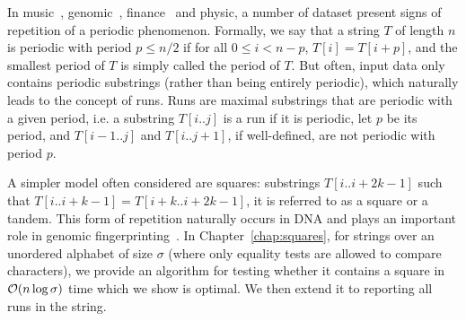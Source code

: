 In music~\cite{arom1989time}, genomic~\cite{pich2018somatic}, finance~\cite{harvey2007trends} and physic, a number of dataset present signs of repetition of a periodic phenomenon.
Formally, we say that a string $T$ of length $n$ is periodic with period $p \leq n/2$ if for all $0 \leq i < n - p$, $T[i]=T[i+p]$, and the smallest period of $T$ is simply called the period of $T$.
%
But often, input data only contains periodic substrings (rather than being entirely periodic), which naturally leads to the concept of runs. Runs are maximal substrings that are periodic with a given period, i.e. a substring $T[i..j]$ is a run if it is periodic, let $p$ be its period, and $T[i-1..j]$ and $T[i..j+1]$, if well-defined, are not periodic with period $p$. 

A simpler model often considered are squares: substrings $T[i..i+2k-1]$ such that $T[i..i+k-1]=T[i+k..i+2k-1]$, it is referred to as a square or a tandem. This form of repetition naturally occurs in DNA and plays an important role in genomic fingerprinting~\cite{Kolpakov2003,GYMREK20179}. 
%
In Chapter~\ref{chap:squares}, for strings over an unordered alphabet of size $\sigma$ (where only equality tests are allowed to compare characters), we provide an algorithm for testing whether it contains a square in $\mathcal{O}(n\log \sigma)$ time which we show is optimal. We then extend it to reporting all runs in the string.

